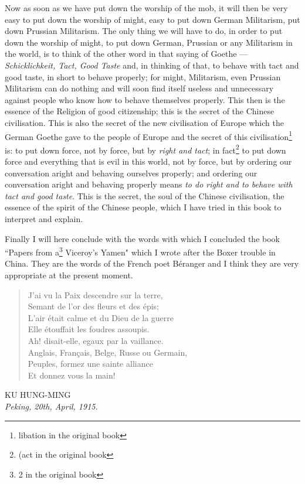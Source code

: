 Now as soon as we have put down the worship of the mob, it will then be very easy to put down the worship of might, easy to put down German Militarism, put down Prussian Militarism.
The only thing we will have to do, in order to put down the worship of might, to put down German, Prussian or any Militarism in the world, is to think of the other word in that saying of Goethe --- \emph{Schicklichkeit, Tact, Good Taste} and, in thinking of that, to behave with tact and good taste, in short to behave properly; for might, Militarism, even Prussian Militarism can do nothing and will soon find itself useless and unnecessary against people who know how to behave themselves properly.
This then is the essence of the Religion of good citizenship; this is the secret of the Chinese civilisation.
This is also the secret of the new civilisation of Europe which the German Goethe gave to the people of Europe and the secret of this civilisation\footnote{libation in the original book} is: to put down force, not by force, but by \emph{right and tact}; in fact\footnote{(act in the original book} to put down force and everything that is evil in this world, not by force, but by ordering our conversation aright and behaving ourselves properly; and ordering our conversation aright and behaving properly means \emph{to do right and to behave with tact and good taste}\cite{num10}. 
This is the secret, the soul of the Chinese civilisation, the essence of the spirit of the Chinese people, which I have tried in this book to interpret and explain.

Finally I will here conclude with the words with which I concluded the book ``Papers from a\footnote{2 in the original book} Viceroy's Yamen" which I wrote after the Boxer trouble in China.
They are the words of the French poet B\'eranger  and I think they are very appropriate at the present moment.
\begin{quote}\footnotesize
    J'ai vu la Paix descendre sur la terre,\\
    Semant de l'or des fleurs et des \'epis;\\
    L'air \'etait calme et du Dieu de la guerre\\
    Elle \'etouffait les foudres assoupis.\\
    Ah! disait-elle, egaux par la vaillance.\\
    Anglais, Fran\c{c}ais, Belge, Russe ou Germain,\\
    Peuples, formez une sainte alliance\\
    Et donnez vous la main!\\
\end{quote}


\vfill
\vspace{2cm}
\hfill KU HUNG-MING \\

\vspace{3cm}
\emph{Peking, 20th, April, 1915.}

